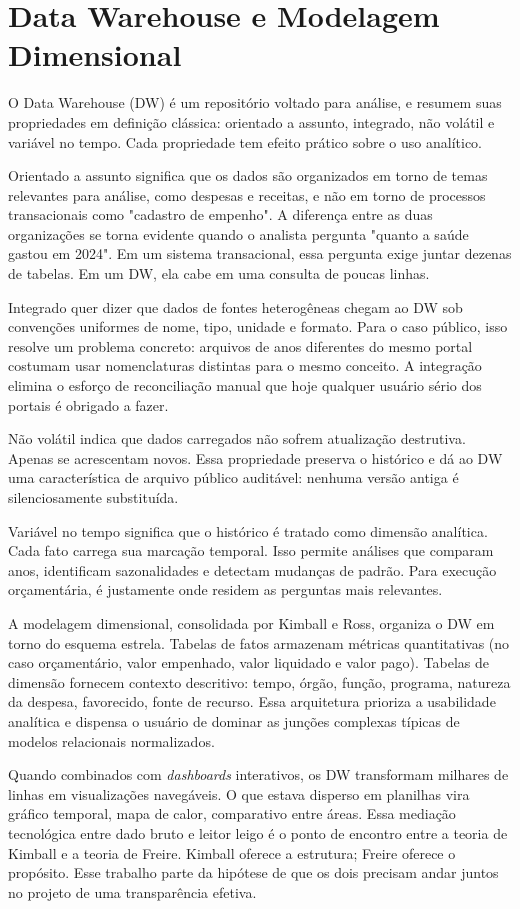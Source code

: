 \section{Data Warehouse e Modelagem Dimensional}

O Data Warehouse (DW) é um repositório voltado para análise, e  resumem suas propriedades em definição clássica: orientado a assunto, integrado, não volátil e variável no tempo. Cada propriedade tem efeito prático sobre o uso analítico.

Orientado a assunto significa que os dados são organizados em torno de temas relevantes para análise, como despesas e receitas, e não em torno de processos transacionais como "cadastro de empenho". A diferença entre as duas organizações se torna evidente quando o analista pergunta "quanto a saúde gastou em 2024". Em um sistema transacional, essa pergunta exige juntar dezenas de tabelas. Em um DW, ela cabe em uma consulta de poucas linhas.

Integrado quer dizer que dados de fontes heterogêneas chegam ao DW sob convenções uniformes de nome, tipo, unidade e formato. Para o caso público, isso resolve um problema concreto: arquivos de anos diferentes do mesmo portal costumam usar nomenclaturas distintas para o mesmo conceito. A integração elimina o esforço de reconciliação manual que hoje qualquer usuário sério dos portais é obrigado a fazer.

Não volátil indica que dados carregados não sofrem atualização destrutiva. Apenas se acrescentam novos. Essa propriedade preserva o histórico e dá ao DW uma característica de arquivo público auditável: nenhuma versão antiga é silenciosamente substituída.

Variável no tempo significa que o histórico é tratado como dimensão analítica. Cada fato carrega sua marcação temporal. Isso permite análises que comparam anos, identificam sazonalidades e detectam mudanças de padrão. Para execução orçamentária, é justamente onde residem as perguntas mais relevantes.

A modelagem dimensional, consolidada por Kimball e Ross, organiza o DW em torno do esquema estrela. Tabelas de fatos armazenam métricas quantitativas (no caso orçamentário, valor empenhado, valor liquidado e valor pago). Tabelas de dimensão fornecem contexto descritivo: tempo, órgão, função, programa, natureza da despesa, favorecido, fonte de recurso. Essa arquitetura prioriza a usabilidade analítica e dispensa o usuário de dominar as junções complexas típicas de modelos relacionais normalizados.

Quando combinados com \textit{dashboards} interativos, os DW transformam milhares de linhas em visualizações navegáveis. O que estava disperso em planilhas vira gráfico temporal, mapa de calor, comparativo entre áreas. Essa mediação tecnológica entre dado bruto e leitor leigo é o ponto de encontro entre a teoria de Kimball e a teoria de Freire. Kimball oferece a estrutura; Freire oferece o propósito. Esse trabalho parte da hipótese de que os dois precisam andar juntos no projeto de uma transparência efetiva.
